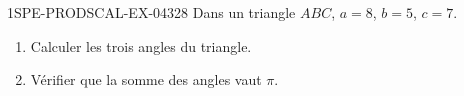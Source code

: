 \begin{exercice}{1SPE-PRODSCAL-EX-043}{2}{8}
Dans un triangle $ABC$, $a = 8$, $b = 5$, $c = 7$.
\begin{enumerate}
  \item Calculer les trois angles du triangle.
  \item Vérifier que la somme des angles vaut $\pi$.
\end{enumerate}
\end{exercice}
